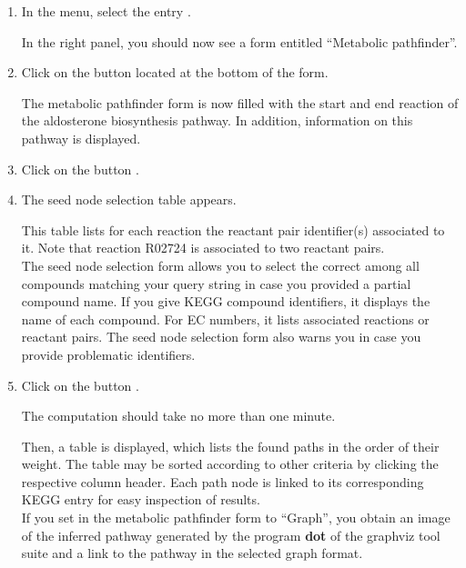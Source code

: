 \begin{enumerate}

\item In the \neat  menu, select the entry .

  In the right panel, you should now see a form entitled
  ``Metabolic pathfinder''.

\item Click on the button  located at the bottom of the form.

  The metabolic pathfinder form is now filled with the start and end reaction of the aldosterone biosynthesis pathway.
  In addition, information on this pathway is displayed.

\item Click on the button .

\item The seed node selection table appears.

		This table lists for each reaction the reactant pair identifier(s) associated to it. Note that reaction
		R02724 is associated to two reactant pairs.\\

		The seed node selection form allows you to select the correct among all compounds matching your query string in case
		you provided a partial compound name.
		If you give KEGG compound identifiers, it displays the name of each compound. For EC numbers, it lists associated
		reactions or reactant pairs.
		The seed node selection form also warns you in case you provide problematic identifiers.

\item Click on the button .

  The computation should take no more than one minute.

  Then, a table is displayed, which lists the found paths in the order of their weight.
  The table may be sorted according to other criteria by clicking the respective column header.
  Each path node is linked to its corresponding KEGG entry for easy inspection of results.\\

  If you set  in the metabolic pathfinder form to ``Graph'', you obtain an image of the inferred
  pathway generated by the program \textbf{dot} of the graphviz tool suite and a link to the pathway in the selected graph format.

\end{enumerate}

